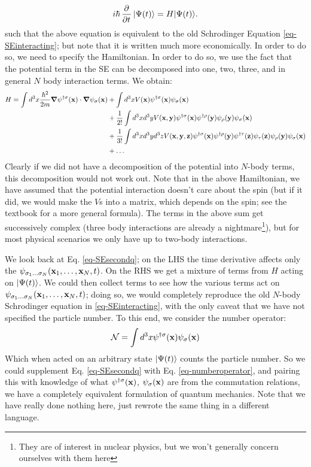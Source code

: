 \begin{equation}\label{eq-SEsecondq}
    i\hbar \dpd{}{t}\ket{\Psi(t)} = H\ket{\Psi(t)}.
\end{equation}
such that the above equation is equivalent to the old Schrodinger Equation \eqref{eq-SEinteracting}; but note that it is written much more economically. In order to do so, we need to specify the Hamiltonian. In order to do so, we use the fact that the potential term in the SE can be decomposed into one, two, three, and in general $N$ body interaction terms. We obtain:
\begin{equation}
    \begin{split}
        H = \int d^3 x \frac{\hbar^2}{2m}\nabla \psi^{\dag\sigma}(\v{x})\cdot \nabla \psi_\sigma(\v{x}) &+ \int d^3x V(\v{x}) \psi^{\dag\sigma}(\v{x})\psi_\sigma(\v{x})
        \\ &+ \frac{1}{2!}\int d^3x d^3y V(\v{x}, \v{y})\psi^{\dag\sigma}(\v{x})\psi^{\dag\rho}(\v{y})\psi_\rho(\v{y})\psi_\sigma(\v{x})
        \\ &+ \frac{1}{3!}\int d^3x d^3y d^3z V(\v{x}, \v{y}, \v{z})\psi^{\dag\sigma}(\v{x})\psi^{\dag\rho}(\v{y})\psi^{\dag\tau}(\v{z})\psi_\tau(\v{z})\psi_\rho(\v{y})\psi_\sigma(\v{x})
        \\ &+ \ldots
    \end{split}
\end{equation}
Clearly if we did not have a decomposition of the potential into $N$-body terms, this decomposition would not work out. Note that in the above Hamiltonian, we have assumed that the potential interaction doesn't care about the spin (but if it did, we would make the $V$s into a matrix, which depends on the spin; see the textbook for a more general formula). The terms in the above sum get successively complex (three body interactions are already a nightmare\footnote{They are of interest in nuclear physics, but we won't generally concern ourselves with them here}), but for most physical scenarios we only have up to two-body interactions.

We look back at Eq. \eqref{eq-SEsecondq}; on the LHS the time derivative affects only the $\psi_{\sigma_1\ldots\sigma_N}(\mathbf{x}_1, \ldots, \mathbf{x}_N, t)$. On the RHS we get a mixture of terms from $H$ acting on $\lvert \Psi(t) \rangle$. We could then collect terms to see how the various terms act on $\psi_{\sigma_1\ldots\sigma_N}(\mathbf{x}_1, \ldots, \mathbf{x}_N, t)$; doing so, we would completely reproduce the old $N$-body Schrodinger equation in \eqref{eq-SEinteracting}, with the only caveat that we have not specified the particle number. To this end, we consider the number operator:
\begin{equation}\label{eq-numberoperator}
    \mathcal{N} = \int d^3 x \psi^{\dagger\sigma}(\mathbf{x})\psi_\sigma(\mathbf{x})
\end{equation}
Which when acted on an arbitrary state $\lvert \Psi(t) \rangle$ counts the particle number. So we could supplement Eq. \eqref{eq-SEsecondq} with Eq. \eqref{eq-numberoperator}, and pairing this with knowledge of what $\psi^{\dagger\sigma}(\mathbf{x})$, $\psi_\sigma(\mathbf{x})$ are from the commutation relations, we have a completely equivalent formulation of quantum mechanics. Note that we have really done nothing here, just rewrote the same thing in a different language.

